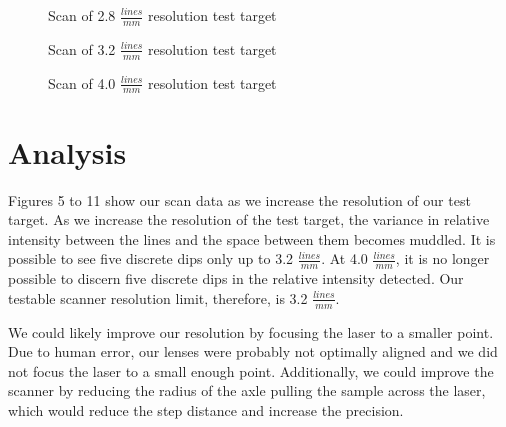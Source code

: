 \documentclass[letterpaper, 12pt]{article}
\begin{document}
  \datathree
\begin{figure}[H]
  \centering
  \caption[caption]{Scan of 2.8 $\frac{lines}{mm}$ resolution test target}
\end{figure}

  \datathree
\begin{figure}[H]
  \centering
  \caption[caption]{Scan of 3.2 $\frac{lines}{mm}$ resolution test target}
\end{figure}

  \datathree
\begin{figure}[H]
  \centering
  \caption[caption]{Scan of 4.0 $\frac{lines}{mm}$ resolution test target}
\end{figure}

\section{Analysis}
\par
Figures 5 to 11 show our scan data as we increase the resolution of our test target. As we increase the resolution of the test target, the variance in relative intensity between the lines and the space between them becomes muddled. It is possible to see five discrete dips only up to 3.2 $\frac{lines}{mm}$. At 4.0 $\frac{lines}{mm}$, it is no longer possible to discern five discrete dips in the relative intensity detected. Our testable scanner resolution limit, therefore, is 3.2 $\frac{lines}{mm}$.
\par
We could likely improve our resolution by focusing the laser to a smaller point. Due to human error, our lenses were probably not optimally aligned and we did not focus the laser to a small enough point. Additionally, we could improve the scanner by reducing the radius of the axle pulling the sample across the laser, which would reduce the step distance and increase the precision.
\end{document}
